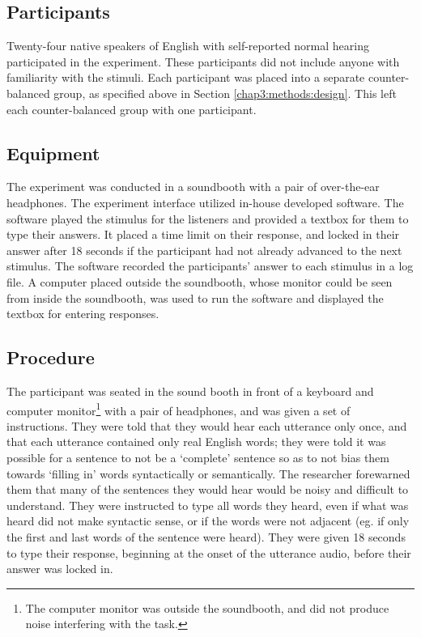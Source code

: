 \subsection{Participants}
\label{chap3:methods:participants}

Twenty-four native speakers of English with self-reported normal hearing participated in the experiment. These participants did not include anyone with familiarity with the stimuli.  Each participant was placed into a separate counter-balanced group, as specified above in Section \ref{chap3:methods:design}.  This left each counter-balanced group with one participant.

\subsection{Equipment}
\label{chap3:methods:equipment}

The experiment was conducted in a soundbooth with a pair of over-the-ear headphones.  The experiment interface utilized in-house developed software.  The software played the stimulus for the listeners and provided a textbox for them to type their answers.  It placed a time limit on their response, and locked in their answer after 18 seconds if the participant had not already advanced to the next stimulus. The software recorded the participants' answer to each stimulus in a log file.  A computer placed outside the soundbooth, whose monitor could be seen from inside the soundbooth, was used to run the software and displayed the textbox for entering responses.

\subsection{Procedure}
\label{chap3:methods:procedure}

The participant was seated in the sound booth in front of a keyboard and computer monitor\footnote{The computer monitor was outside the soundbooth, and did not produce noise interfering with the task.} with a pair of headphones, and was given a set of instructions. They were told that they would hear each utterance only once, and that each utterance contained only real English words; they were told it was possible for a sentence to not be a `complete' sentence so as to not bias them towards `filling in' words syntactically or semantically.  The researcher forewarned them that many of the sentences they would hear would be noisy and difficult to understand. They were instructed to type all words they heard, even if what was heard did not make syntactic sense, or if the words were not adjacent (eg. if only the first and last words of the sentence were heard). They were given 18 seconds to type their response, beginning at the onset of the utterance audio, before their answer was locked in.

